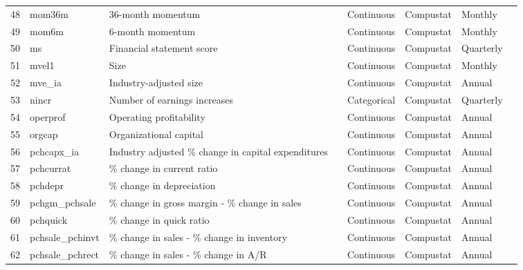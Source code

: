 \documentclass[a4paper, table]{article}
\begin{document}
\begin{landscape}
\begin{table}
\begin{center}
\begin{longtable}{llllllll}
			48 & mom36m & 36-month momentum & 
				\cite{jegadeesh_returns_1993} & Continuous & Compustat & Monthly \\
			49 & mom6m & 6-month momentum & 
				\cite{jegadeesh_returns_1993} & Continuous & Compustat & Monthly \\
			50 & ms & Financial statement score & 
				\cite{mohanram_separating_2005} & Continuous & Compustat & Quarterly \\
			51 & mvel1 & Size & 
				\cite{banz_relationship_1981} & Continuous & Compustat & Monthly \\
			52 & mve\_ia & Industry-adjusted size & 
				\cite{asness_predicting_2000} & Continuous & Compustat & Annual \\
			53 & nincr & Number of earnings increases & 
				\cite{barth_market_1999} & Categorical & Compustat & Quarterly \\
			54 & operprof & Operating profitability & 
				\cite{fama_five-factor_2015} & Continuous & Compustat & Annual \\
			55 & orgcap & Organizational capital & 
				\cite{eisfeldt_organization_2013} & Continuous & Compustat & Annual \\
			56 & pchcapx\_ia & Industry adjusted \% change in capital expenditures & 
				\cite{abarbanell_abnormal_1998} & Continuous & Compustat & Annual \\
			57 & pchcurrat & \% change in current ratio & 
				\cite{ou_financial_1989} & Continuous & Compustat & Annual \\
			58 & pchdepr & \% change in depreciation & 
				\cite{holthausen_prediction_1992} & Continuous & Compustat & Annual \\
			59 & pchgm\_pchsale & \% change in gross margin - \% change in sales & 
				\cite{abarbanell_abnormal_1998} & Continuous & Compustat & Annual \\ \hline
			60 & pchquick & \% change in quick ratio & 
				\cite{ou_financial_1989} & Continuous & Compustat & Annual \\
			61 & pchsale\_pchinvt & \% change in sales - \% change in inventory & 
				\cite{abarbanell_abnormal_1998} & Continuous & Compustat & Annual \\
			62 & pchsale\_pchrect & \% change in sales - \% change in A/R & 
				\cite{abarbanell_abnormal_1998} & Continuous & Compustat & Annual \\

\end{longtable}
\end{center}
\end{table}
\end{landscape}
\end{document}
